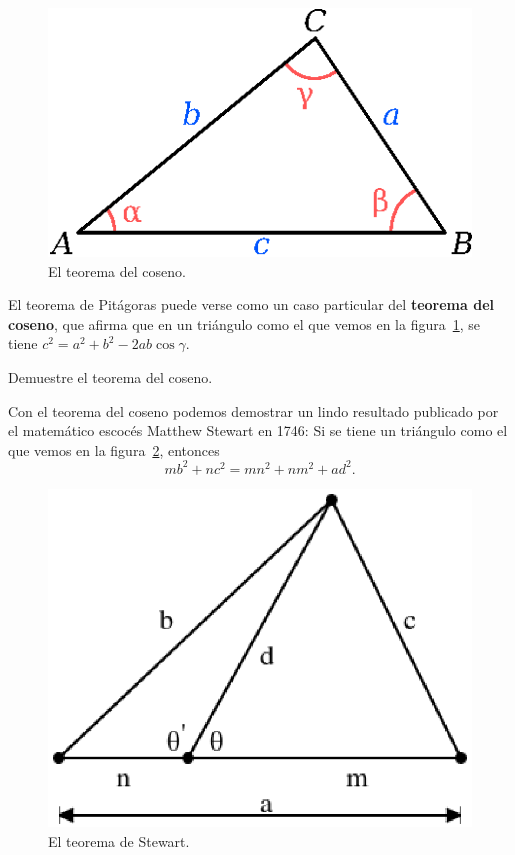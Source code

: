 \begin{figure}[h]
	\centering
	\includegraphics[scale=.5]{images/coseno}
	\caption{El teorema del coseno.}
	\label{fig:coseno}
\end{figure}

El teorema de Pitágoras puede verse como un caso particular del \textbf{teorema
del coseno}, que afirma que en un triángulo como el que vemos en la
figura~\ref{fig:coseno}, se tiene $c^2=a^2+b^2-2ab\cos\gamma$.

\begin{exercise}
	Demuestre el teorema del coseno.
\end{exercise}

Con el teorema del coseno podemos demostrar un lindo resultado publicado por el
matemático escocés Matthew Stewart en 1746: Si se tiene un triángulo como el
que vemos en la figura~\ref{fig:Stewart}, entonces
\[
	mb^2+nc^2=mn^2+nm^2+ad^2.
\]

\begin{figure}[h]
	\centering
	\includegraphics[scale=.4]{images/stewart}
	\caption{El teorema de Stewart.}
	\label{fig:Stewart}
\end{figure}

